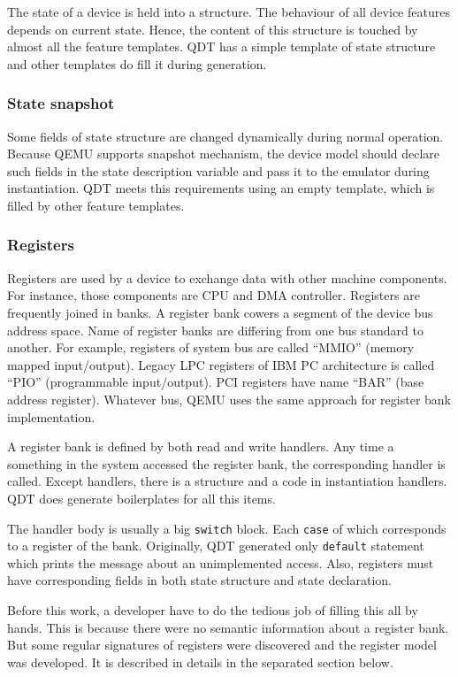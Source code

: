\documentclass[conference,compsoc,a4paper]{IEEEtran}
\begin{document}
The state of a device is held into a structure.
The behaviour of all device features depends on current state.
Hence, the content of this structure is touched by almost all
the feature templates.
QDT has a simple template of state structure and other templates
do fill it during generation.

\subsubsection{State snapshot}

Some fields of state structure are changed dynamically during normal
operation.
Because QEMU supports snapshot mechanism, the device model should
declare such fields in the state description variable and pass it
to the emulator during instantiation.
QDT meets this requirements using an empty template, which is
filled by other feature templates.

\subsubsection{Registers}

Registers are used by a device to exchange data with other machine
components.
For instance, those components are CPU and DMA controller.
Registers are frequently joined in banks.
A register bank cowers a segment of the device bus address space.
Name of register banks are differing from one bus standard to another.
For example, registers of system bus are called ``MMIO''
(memory mapped input/output).
Legacy LPC registers of IBM PC architecture is called ``PIO''
(programmable input/output).
PCI registers have name ``BAR'' (base address register).
Whatever bus, QEMU uses the same approach for register bank
implementation.

A register bank is defined by both read and write handlers.
Any time a something in the system accessed the register bank,
the corresponding handler is called.
Except handlers, there is a structure and a code in
instantiation handlers.
QDT does generate boilerplates for all this items.

The handler body is usually a big \texttt{switch} block.
Each \texttt{case} of which corresponds to a register of the bank.
Originally, QDT generated only \texttt{default} statement which prints
the message about an unimplemented access.
Also, registers must have corresponding fields in both state structure
and state declaration.

Before this work, a developer have to do the tedious job of
filling this all by hands.
This is because there were no semantic information about a register
bank.
But some regular signatures of registers were discovered and the register
model was developed.
It is described in details in the separated section below.
\end{document}
